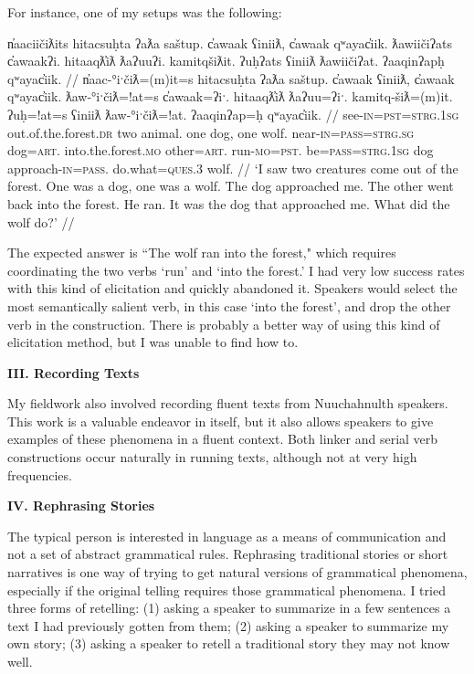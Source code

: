 For instance, one of my setups was the following:

\ex \label{ex:wolfsetup}
\begingl
\glpreamble n̓aaciičiƛits hitacsuḥta ʔaƛa saštup. c̓awaak ʕiniiƛ, c̓awaak qʷayac̓iik. ƛawiičiʔats c̓awaakʔi. hitaaqƛ̓iƛ ƛaʔuuʔi. kamitqšiƛit. ʔuḥʔats ʕiniiƛ ƛawiičiʔat. ʔaaqinʔapḥ qʷayac̓iik. //
\gla n̓aac-°iˑčiƛ=(m)it=s hitacsuḥta ʔaƛa saštup. c̓awaak ʕiniiƛ, c̓awaak qʷayac̓iik. ƛaw-°iˑčiƛ=!at=s c̓awaak=ʔiˑ. hitaaqƛ̓iƛ ƛaʔuu=ʔiˑ. kamitq-šiƛ=(m)it. ʔuḥ=!at=s ʕiniiƛ ƛaw-°iˑčiƛ=!at. ʔaaqinʔap=ḥ qʷayac̓iik. //
\glb see-\textsc{in}=\textsc{pst}=\textsc{strg.1sg} out.of.the.forest.\textsc{dr} two animal. one dog, one wolf. near-\textsc{in}=\textsc{pass}=\textsc{strg.sg} dog=\textsc{art}. into.the.forest.\textsc{mo} other=\textsc{art}. run-\textsc{mo}=\textsc{pst}. be=\textsc{pass}=\textsc{strg.1sg} dog approach-\textsc{in}=\textsc{pass}. do.what=\textsc{ques.3} wolf. //
\glft `I saw two creatures come out of the forest. One was a dog, one was a wolf. The dog approached me. The other went back into the forest. He ran. It was the dog that approached me. What did the wolf do?' //
\endgl
\xe

The expected answer is ``The wolf ran into the forest," which requires coordinating the two verbs `run' and `into the forest.' I had very low success rates with this kind of elicitation and quickly abandoned it. Speakers would select the most semantically salient verb, in this case `into the forest', and drop the other verb in the construction. There is probably a better way of using this kind of elicitation method, but I was unable to find how to.

\vspace{8pt}

\noindent \textbf{III. Recording Texts}

My fieldwork also involved recording fluent texts from Nuuchahnulth speakers. This work is a valuable endeavor in itself, but it also allows speakers to give examples of these phenomena in a fluent context. Both linker and serial verb constructions occur naturally in running texts, although not at very high frequencies.

\vspace{8pt}

\noindent \textbf{IV. Rephrasing Stories}

The typical person is interested in language as a means of communication and not a set of abstract grammatical rules. Rephrasing traditional stories or short narratives is one way of trying to get natural versions of grammatical phenomena, especially if the original telling requires those grammatical phenomena. I tried three forms of retelling: (1) asking a speaker to summarize in a few sentences a text I had previously gotten from them; (2) asking a speaker to summarize my own story; (3) asking a speaker to retell a traditional story they may not know well.

